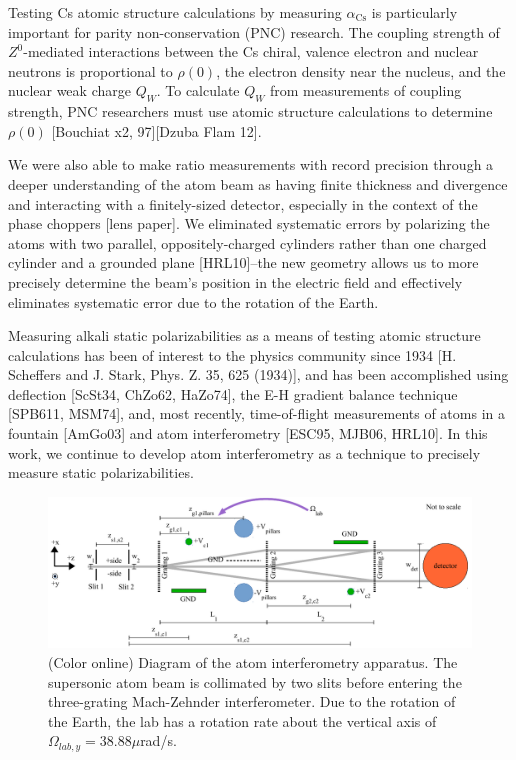 \documentclass[twocolumn, prl,showpacs,superscriptaddress]{revtex4-1}   %
\newcommand{\acs}{\alpha_{\textrm{Cs}}}
\begin{document}
Testing Cs atomic structure calculations by measuring $\acs$ is particularly important for parity non-conservation (PNC) research. The coupling strength of $Z^0$-mediated interactions between the Cs chiral, valence electron and nuclear neutrons is proportional to $\rho(0)$, the electron density near the nucleus, and the nuclear weak charge $Q_W$. To calculate $Q_W$ from measurements of coupling strength, PNC researchers must use atomic structure calculations to determine $\rho(0)$ [Bouchiat x2, 97][Dzuba Flam 12]. 

We were also able to make ratio measurements with record precision through a deeper understanding of the atom beam as having finite thickness and divergence and interacting with a finitely-sized detector, especially in the context of the phase choppers [lens paper]. We eliminated systematic errors by polarizing the atoms with two parallel, oppositely-charged cylinders rather than one charged cylinder and a grounded plane [HRL10]--the new geometry allows us to more precisely determine the beam's position in the electric field and effectively eliminates systematic error due to the rotation of the Earth.

Measuring alkali static polarizabilities as a means of testing atomic 
structure calculations has been of interest to the physics community since
1934 [H. Scheffers and J. Stark, Phys. Z. 35, 625 (1934)], and has been
accomplished using deflection [ScSt34, ChZo62, HaZo74], the E-H gradient
balance technique [SPB611, MSM74], and, most recently, time-of-flight measurements of atoms in a fountain [AmGo03] and atom interferometry 
[ESC95, MJB06, HRL10]. In this work, we continue to develop atom interferometry as a technique to precisely measure static polarizabilities.

\begin{figure}
\includegraphics[width=\linewidth,keepaspectratio]{IFM_diagram1.pdf}
\caption{\label{IFMDiagram}(Color online) Diagram of the atom interferometry apparatus. The supersonic atom beam is collimated by two slits before entering the three-grating Mach-Zehnder interferometer. Due to the rotation of the Earth, the lab has a rotation rate about the vertical axis of $\Omega_{lab,y} = 38.88\mu$rad/s. }
\end{figure}
\end{document}
